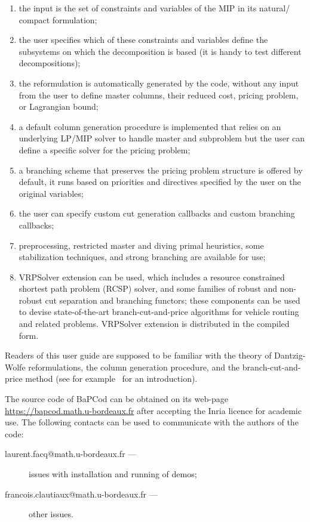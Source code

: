 \documentclass[10pt,a4paper]{article}
\newcommand{\bc}{BaPCod\xspace}
\begin{document}
\begin{enumerate}
\item the input is the set of constraints and variables of the MIP in its natural/ compact formulation;
\item the user specifies which of these constraints and variables define the subsystems on which the decomposition is
  based (it is handy to test different decompositions);
\item the reformulation is automatically generated by the code, without any input from the user to define master
  columns, their reduced cost, pricing problem, or Lagrangian bound;
\item a default column generation procedure is implemented that relies on an underlying LP/MIP solver to handle master and
  subproblem but the user can define a specific solver for the pricing problem;
\item a branching scheme that preserves the pricing problem structure is offered by default, it runs based on priorities
  and directives specified by the user on the original variables;
\item the user can specify custom cut generation callbacks and custom branching callbacks;
\item preprocessing, restricted master and diving primal heuristics, some stabilization techniques, and strong branching
  are available for use;
\item VRPSolver extension can be used, which includes a resource constrained shortest
  path problem (RCSP) solver, and some families of robust and non-robust cut separation and branching functors; these components can be used to devise state-of-the-art branch-cut-and-price algorithms for vehicle routing and related problems. VRPSolver extension is distributed in the compiled form. 
\end{enumerate}

Readers of this user guide are supposed to be familiar with the theory of Dantzig-Wolfe reformulations, the column
generation procedure, and the branch-cut-and-price method (see for example~\cite{DesrosierLubbecke:11a} for an
introduction).

The source code of \bc can be obtained on its web-page \url{https://bapcod.math.u-bordeaux.fr} after accepting the Inria licence for academic use. The following contacts can be used to communicate with the authors of the code:
\begin{description}
\item[laurent.facq@math.u-bordeaux.fr ---] issues with installation and running of demos;
\item[francois.clautiaux@math.u-bordeaux.fr ---] other issues.
\end{description}
\end{document}
